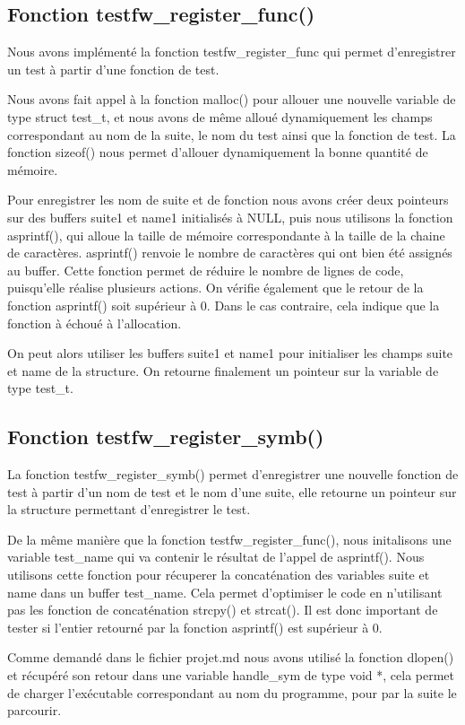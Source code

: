 \documentclass{article}
\begin{document}
\subsection{Fonction testfw\_register\_func()}
Nous avons implémenté la fonction testfw\_register\_func qui permet d'enregistrer un test à partir d'une fonction de test.  

Nous avons fait appel à la fonction malloc() pour allouer une nouvelle variable de type struct test\_t, et nous avons de même alloué dynamiquement les champs correspondant au nom de la suite, le nom du test ainsi que la fonction de test.  La fonction sizeof() nous permet d'allouer dynamiquement la bonne quantité de mémoire.  

Pour enregistrer les nom de suite et de fonction nous avons créer deux pointeurs sur des buffers suite1 et name1 initialisés à NULL, puis nous utilisons la fonction asprintf(), qui alloue la taille de mémoire correspondante à la taille de la chaine de caractères. asprintf() renvoie le nombre de caractères qui ont bien été assignés au buffer. Cette fonction permet de réduire le nombre de lignes de code, puisqu'elle réalise plusieurs actions. On vérifie également que le retour de la fonction asprintf() soit supérieur à 0. Dans le cas contraire, cela indique que la fonction à échoué à l'allocation. 

On peut alors utiliser les buffers suite1 et name1 pour initialiser les champs suite et name de la structure. On retourne finalement un pointeur sur la variable de type test\_t.

\subsection{Fonction testfw\_register\_symb()}
La fonction testfw\_register\_symb() permet d'enregistrer une nouvelle fonction de test  à partir d'un nom de test et le nom d'une suite, elle retourne un pointeur  sur la structure permettant d'enregistrer le test. 

De la même manière que la fonction testfw\_register\_func(), nous initalisons une variable test\_name qui va contenir le résultat de l'appel de asprintf(). Nous utilisons cette fonction pour récuperer la concaténation des variables suite et name dans un buffer test\_name. Cela permet d'optimiser le code en n'utilisant pas les fonction de concaténation strcpy() et strcat().  Il est donc important de tester si l'entier retourné par la fonction asprintf() est supérieur à 0. 

Comme demandé dans le fichier projet.md nous avons utilisé la fonction dlopen() et récupéré son retour dans une variable handle\_sym de type void *, cela permet de charger l'exécutable correspondant au nom du programme, pour par la suite le parcourir. 
\end{document}
